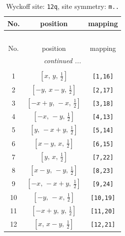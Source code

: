 \documentclass[fleqn,8pt]{jsarticle}
\begin{document}
\begin{longtable}{ccc}
\caption{Wyckoff site: {\tt 12q}, site symmetry: {\tt m..}}
 \\
 \hline \hline
No. & position & mapping \\ \hline \endfirsthead

\multicolumn{2}{l}{\tablename\ \thetable{}} \\
 \hline \hline
No. & position & mapping \\ \hline \endhead

 \hline \hline
\multicolumn{2}{r}{\footnotesize\it continued ...} \\ \endfoot

 \hline \hline
\multicolumn{2}{r}{} \\ \endlastfoot

1 & $\left[ x,\, y,\, \frac{1}{2} \right]$ & {\tt [1,16]} \\ \hline
2 & $\left[ - y,\, x - y,\, \frac{1}{2} \right]$ & {\tt [2,17]} \\ \hline
3 & $\left[ - x + y,\, - x,\, \frac{1}{2} \right]$ & {\tt [3,18]} \\ \hline
4 & $\left[ - x,\, - y,\, \frac{1}{2} \right]$ & {\tt [4,13]} \\ \hline
5 & $\left[ y,\, - x + y,\, \frac{1}{2} \right]$ & {\tt [5,14]} \\ \hline
6 & $\left[ x - y,\, x,\, \frac{1}{2} \right]$ & {\tt [6,15]} \\ \hline
7 & $\left[ y,\, x,\, \frac{1}{2} \right]$ & {\tt [7,22]} \\ \hline
8 & $\left[ x - y,\, - y,\, \frac{1}{2} \right]$ & {\tt [8,23]} \\ \hline
9 & $\left[ - x,\, - x + y,\, \frac{1}{2} \right]$ & {\tt [9,24]} \\ \hline
10 & $\left[ - y,\, - x,\, \frac{1}{2} \right]$ & {\tt [10,19]} \\ \hline
11 & $\left[ - x + y,\, y,\, \frac{1}{2} \right]$ & {\tt [11,20]} \\ \hline
12 & $\left[ x,\, x - y,\, \frac{1}{2} \right]$ & {\tt [12,21]} \\
\end{longtable}
\renewcommand{\arraystretch}{1.2}
\end{document}
